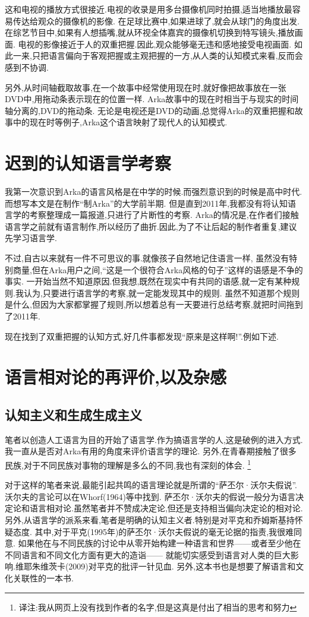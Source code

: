 这和电视的播放方式很接近.电视的收录是用多台摄像机同时拍摄,适当地播放最容易传达给观众的摄像机的影像.
在足球比赛中,如果进球了,就会从球门的角度出发.在综艺节目中,如果有人想插嘴,就从环视全体嘉宾的摄像机切换到特写镜头,播放画面.
电视的影像接近于人的双重把握.因此,观众能够毫无违和感地接受电视画面.
如此一来,只把语言偏向于客观把握或主观把握的一方,从人类的认知模式来看,反而会感到不协调.

另外,从时间轴截取故事,在一个故事中经常使用现在时,就好像把故事放在一张DVD中,用拖动条表示现在的位置一样.
Arka故事中的现在时相当于与现实的时间轴分离的,DVD的拖动条.
无论是电视还是DVD的动画,总觉得Arka的双重把握和故事中的现在时等例子,Arka这个语言映射了现代人的认知模式.

\section{迟到的认知语言学考察}
我第一次意识到Arka的语言风格是在中学的时候.而强烈意识到的时候是高中时代.而想写本文是在制作``制Arka''的大学前半期.
但是直到2011年,我都没有将认知语言学的考察整理成一篇报道,只进行了片断性的考察.
Arka的情况是,在作者们接触语言学之前就有语言制作,所以经历了曲折.因此,为了不让后起的制作者重复,建议先学习语言学.

不过,自古以来就有一件不可思议的事.就像孩子自然地记住语言一样,
虽然没有特别商量,但在Arka用户之间,“这是一个很符合Arka风格的句子”这样的语感是不争的事实.
一开始当然不知道原因.但我想,既然在现实中有共同的语感,就一定有某种规则.我认为,只要进行语言学的考察,就一定能发现其中的规则.
虽然不知道那个规则是什么,但因为大家都掌握了规则,所以想着总有一天要进行总结考察,就把时间拖到了2011年.

现在找到了双重把握的认知方式,好几件事都发现“原来是这样啊!”.例如下述.
\section{语言相对论的再评价,以及杂感}
\subsection{认知主义和生成生成主义}
笔者以创造人工语言为目的开始了语言学.作为搞语言学的人,这是破例的进入方式.我一直从是否对Arka有用的角度来评价语言学的理论.
另外,在青春期接触了很多民族,对于不同民族对事物的理解是多么的不同,我也有深刻的体会.
\footnote{译注:我从网页上没有找到作者的名字,但是这真是付出了相当的思考和努力}

对于这样的笔者来说,最能引起共鸣的语言理论就是所谓的“萨丕尔·沃尔夫假说”.沃尔夫的言论可以在Whorf(1964)等中找到.
萨丕尔·沃尔夫的假说一般分为语言决定论和语言相对论.虽然笔者并不赞成决定论,但还是支持相当偏向决定论的相对论.
另外,从语言学的派系来看,笔者是明确的认知主义者.特别是对平克和乔姆斯基持怀疑态度.
其中,对于平克(1995年)的萨丕尔·沃尔夫假说的毫无论据的指责,我很难同意.
如果他在与不同民族的讨论中从零开始构建一种语言和世界------或者至少他在不同语言和不同文化方面有更大的造诣------
就能切实感受到语言对人类的巨大影响.维耶朱维茨卡(2009)对平克的批评一针见血.
另外,这本书也是想要了解语言和文化关联性的一本书.

